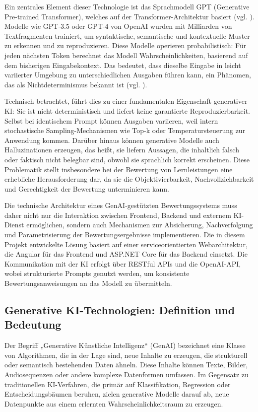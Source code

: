 \documentclass[a4paper,12pt]{article}
\begin{document}
Ein zentrales Element dieser Technologie ist das Sprachmodell GPT (Generative Pre-trained Transformer), welches auf der Transformer-Architektur basiert (vgl. \textcite{vaswani2017attention}). Modelle wie GPT-3.5 oder GPT-4 von OpenAI wurden mit Milliarden von Textfragmenten trainiert, um syntaktische, semantische und kontextuelle Muster zu erkennen und zu reproduzieren. Diese Modelle operieren probabilistisch: Für jeden nächsten Token berechnet das Modell Wahrscheinlichkeiten, basierend auf dem bisherigen Eingabekontext. Das bedeutet, dass dieselbe Eingabe in leicht variierter Umgebung zu unterschiedlichen Ausgaben führen kann, ein Phänomen, das als Nichtdeterminismus bekannt ist (vgl. \textcite{openai_reasoning}).

Technisch betrachtet, führt dies zu einer fundamentalen Eigenschaft generativer KI: Sie ist nicht deterministisch und liefert keine garantierte Reproduzierbarkeit. Selbst bei identischem Prompt können Ausgaben variieren, weil intern stochastische Sampling-Mechanismen wie Top-k oder Temperatursteuerung zur Anwendung kommen. Darüber hinaus können generative Modelle auch Halluzinationen erzeugen, das heißt, sie liefern Aussagen, die inhaltlich falsch oder faktisch nicht belegbar sind, obwohl sie sprachlich korrekt erscheinen. Diese Problematik stellt insbesondere bei der Bewertung von Lernleistungen eine erhebliche Herausforderung dar, da sie die Objektivierbarkeit, Nachvollziehbarkeit und Gerechtigkeit der Bewertung unterminieren kann.

Die technische Architektur eines GenAI-gestützten Bewertungssystems muss daher nicht nur die Interaktion zwischen Frontend, Backend und externem KI-Dienst ermöglichen, sondern auch Mechanismen zur Absicherung, Nachverfolgung und Parametrisierung der Bewertungsergebnisse implementieren. Die in diesem Projekt entwickelte Lösung basiert auf einer serviceorientierten Webarchitektur, die Angular für das Frontend und ASP.NET Core für das Backend einsetzt. Die Kommunikation mit der KI erfolgt über RESTful APIs und die OpenAI-API, wobei strukturierte Prompts genutzt werden, um konsistente Bewertungsanweisungen an das Modell zu übermitteln.


\subsection{Generative KI-Technologien: Definition und Bedeutung}
Der Begriff „Generative Künstliche Intelligenz“ (GenAI) bezeichnet eine Klasse von Algorithmen, die in der Lage sind, neue Inhalte zu erzeugen, die strukturell oder semantisch bestehenden Daten ähneln. Diese Inhalte können Texte, Bilder, Audiosequenzen oder andere komplexe Datenformen umfassen. Im Gegensatz zu traditionellen KI-Verfahren, die primär auf Klassifikation, Regression oder Entscheidungsbäumen beruhen, zielen generative Modelle darauf ab, neue Datenpunkte aus einem erlernten Wahrscheinlichkeitsraum zu erzeugen.
\end{document}
